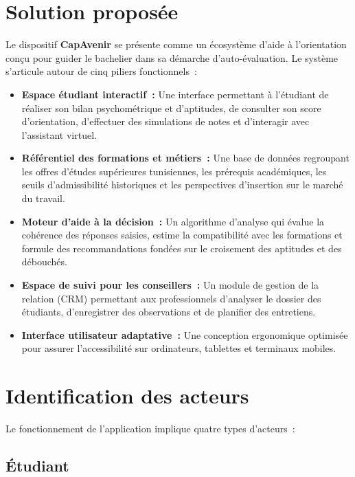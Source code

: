 \section{Solution proposée}
\label{sec:solution}

Le dispositif \textbf{CapAvenir} se présente comme un écosystème d'aide à l'orientation conçu pour guider le bachelier dans sa démarche d'auto-évaluation. Le système s'articule autour de cinq piliers fonctionnels~:

\begin{itemize}
    \item \textbf{Espace étudiant interactif~:} Une interface permettant à l'étudiant de réaliser son bilan psychométrique et d'aptitudes, de consulter son score d'orientation, d'effectuer des simulations de notes et d'interagir avec l'assistant virtuel.
    \item \textbf{Référentiel des formations et métiers~:} Une base de données regroupant les offres d'études supérieures tunisiennes, les prérequis académiques, les seuils d'admissibilité historiques et les perspectives d'insertion sur le marché du travail.
    \item \textbf{Moteur d'aide à la décision~:} Un algorithme d'analyse qui évalue la cohérence des réponses saisies, estime la compatibilité avec les formations et formule des recommandations fondées sur le croisement des aptitudes et des débouchés.
    \item \textbf{Espace de suivi pour les conseillers~:} Un module de gestion de la relation (CRM) permettant aux professionnels d'analyser le dossier des étudiants, d'enregistrer des observations et de planifier des entretiens.
    \item \textbf{Interface utilisateur adaptative~:} Une conception ergonomique optimisée pour assurer l'accessibilité sur ordinateurs, tablettes et terminaux mobiles.
\end{itemize}

\section{Identification des acteurs}
\label{sec:acteurs}

Le fonctionnement de l'application implique quatre types d'acteurs~:

\subsection{Étudiant}


